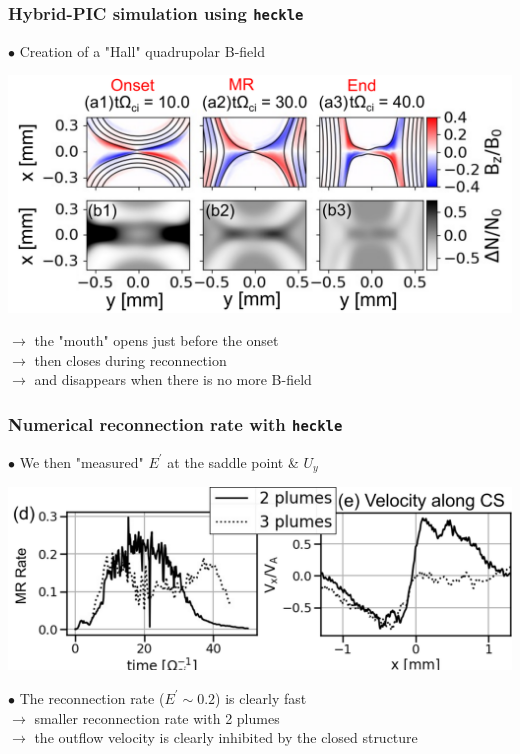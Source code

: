\documentclass{beamer}
\begin{document}
\begin{frame}
\frametitle{Hybrid-PIC simulation using \texttt{heckle}}

$\bullet$ Creation of a "Hall" quadrupolar B-field\\

\begin{center}
\includegraphics[width=1.0\textwidth]{heckle.png}
\end{center}

$\to$ the "mouth" opens just before the onset \\
$\to$ then closes during reconnection \\
$\to$ and disappears when there is no more B-field \\

\end{frame}



\begin{frame}
\frametitle{Numerical reconnection rate with \texttt{heckle}}

$\bullet$ We then "measured" $E^{\prime}$ at the saddle point \& $U_y$ \\

\begin{center}
\includegraphics[width=1.0\textwidth]{recrate.png}
\end{center}

$\bullet$ The reconnection rate ($E^{\prime} \sim 0.2$) is clearly fast \\
$\to$ smaller reconnection rate with 2 plumes \\
$\to$ the outflow velocity is clearly inhibited by the closed structure \\

\end{frame}
\end{document}
